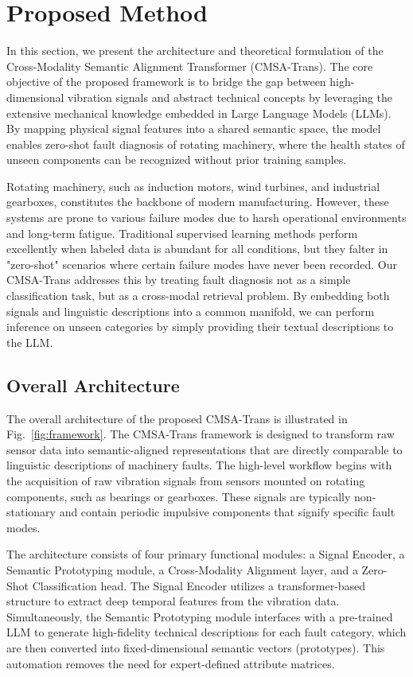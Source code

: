\documentclass[journal]{IEEEtran}
\begin{document}
\section{Proposed Method}
In this section, we present the architecture and theoretical formulation of the Cross-Modality Semantic Alignment Transformer (CMSA-Trans). The core objective of the proposed framework is to bridge the gap between high-dimensional vibration signals and abstract technical concepts by leveraging the extensive mechanical knowledge embedded in Large Language Models (LLMs). By mapping physical signal features into a shared semantic space, the model enables zero-shot fault diagnosis of rotating machinery, where the health states of unseen components can be recognized without prior training samples.

Rotating machinery, such as induction motors, wind turbines, and industrial gearboxes, constitutes the backbone of modern manufacturing. However, these systems are prone to various failure modes due to harsh operational environments and long-term fatigue. Traditional supervised learning methods perform excellently when labeled data is abundant for all conditions, but they falter in "zero-shot" scenarios where certain failure modes have never been recorded. Our CMSA-Trans addresses this by treating fault diagnosis not as a simple classification task, but as a cross-modal retrieval problem. By embedding both signals and linguistic descriptions into a common manifold, we can perform inference on unseen categories by simply providing their textual descriptions to the LLM.

\subsection{Overall Architecture}
The overall architecture of the proposed CMSA-Trans is illustrated in Fig.~\ref{fig:framework}. The CMSA-Trans framework is designed to transform raw sensor data into semantic-aligned representations that are directly comparable to linguistic descriptions of machinery faults. The high-level workflow begins with the acquisition of raw vibration signals from sensors mounted on rotating components, such as bearings or gearboxes. These signals are typically non-stationary and contain periodic impulsive components that signify specific fault modes.

The architecture consists of four primary functional modules: a Signal Encoder, a Semantic Prototyping module, a Cross-Modality Alignment layer, and a Zero-Shot Classification head. The Signal Encoder utilizes a transformer-based structure \cite{vaswani2017attention, zerveas2021transformer} to extract deep temporal features from the vibration data. Simultaneously, the Semantic Prototyping module interfaces with a pre-trained LLM \cite{radford2021learning} to generate high-fidelity technical descriptions for each fault category, which are then converted into fixed-dimensional semantic vectors (prototypes). This automation removes the need for expert-defined attribute matrices.
\end{document}
